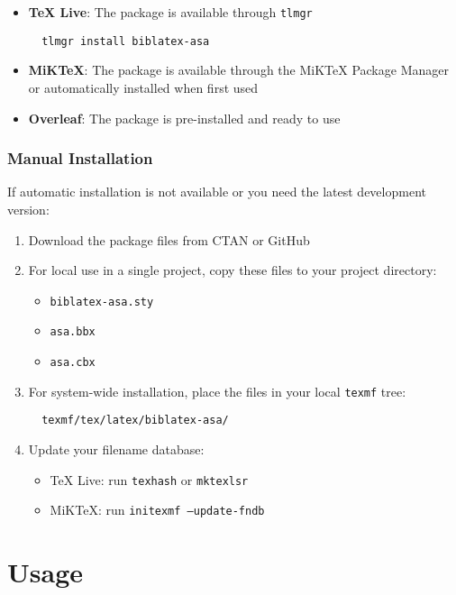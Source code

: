 \documentclass[11pt,a4paper]{ltxdoc}
\begin{document}
\begin{itemize}
  \item \textbf{TeX Live}: The package is available through \texttt{tlmgr}
  \begin{verbatim}
  tlmgr install biblatex-asa
  \end{verbatim}
  
  \item \textbf{MiKTeX}: The package is available through the MiKTeX Package Manager or automatically installed when first used
  
  \item \textbf{Overleaf}: The package is pre-installed and ready to use
\end{itemize}

\subsubsection{Manual Installation}

If automatic installation is not available or you need the latest development version:

\begin{enumerate}
  \item Download the package files from CTAN or GitHub
  \item For local use in a single project, copy these files to your project directory:
  \begin{itemize}
    \item \texttt{biblatex-asa.sty}
    \item \texttt{asa.bbx}
    \item \texttt{asa.cbx}
  \end{itemize}
  \item For system-wide installation, place the files in your local \texttt{texmf} tree:
  \begin{verbatim}
  texmf/tex/latex/biblatex-asa/
  \end{verbatim}
  \item Update your filename database:
  \begin{itemize}
    \item TeX Live: run \texttt{texhash} or \texttt{mktexlsr}
    \item MiKTeX: run \texttt{initexmf --update-fndb}
  \end{itemize}
\end{enumerate}

\section{Usage}
\end{document}
